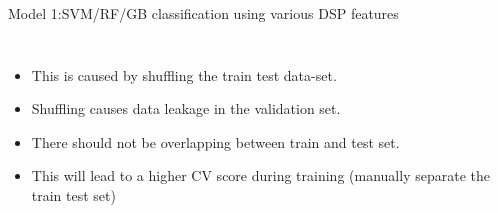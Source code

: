 \documentclass{beamer}
\begin{document}
\begin{frame}{Model 1:SVM/RF/GB classification using various DSP features}
\begin{columns}
    \begin{itemize}
    \item This is caused by shuffling the train test data-set.
    \item Shuffling causes data leakage in the validation set.
    \item There should not be overlapping between train and test set.
    \item This will lead to a higher CV score during training (manually separate the train test set)
 
    \end{itemize}

    
  \end{columns}

\end{frame}
\end{document}

